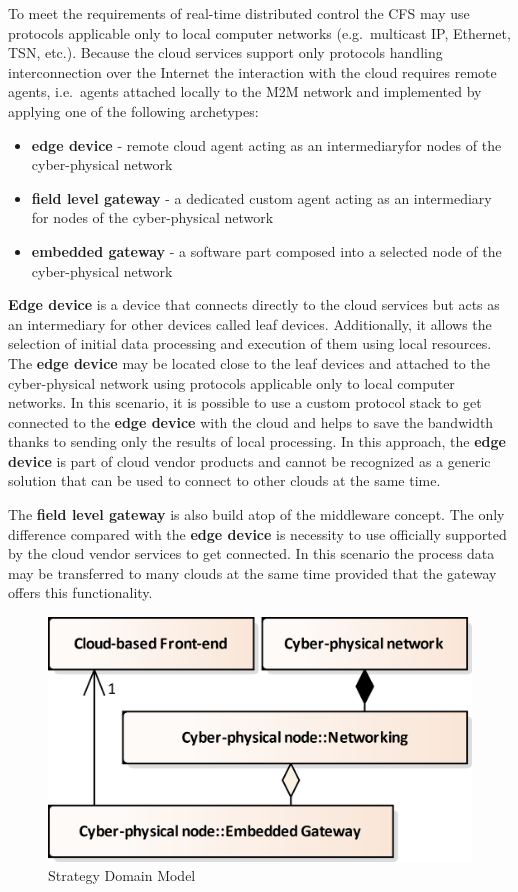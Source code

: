 \documentclass{jacsart}
\begin{document}
To meet the requirements of real-time distributed control the CFS may use protocols applicable only to local computer networks (e.g.~multicast IP, Ethernet, TSN, etc.). Because the cloud services support only protocols handling interconnection over the Internet the interaction with the cloud requires remote agents, i.e.~agents attached locally to the M2M network and implemented by applying one of the following archetypes:

\begin{itemize}
      \item \textbf{edge device} - remote cloud agent acting as an intermediaryfor nodes of the cyber-physical network
      \item \textbf{field level gateway} - a dedicated custom agent acting as an intermediary for nodes of the cyber-physical network
      \item \textbf{embedded gateway} - a software part composed into a selected node of the cyber-physical network
\end{itemize}

\textbf{Edge device} is a device that connects directly to the cloud services but acts as an intermediary for other devices called leaf devices. Additionally, it allows the selection of initial data processing and execution of them using local resources. The \textbf{edge device} may be located close to the leaf devices and attached to the cyber-physical network using protocols applicable only to local computer networks. In this scenario, it is possible to use a custom protocol stack to get connected to the \textbf{edge device} with the cloud and helps to save the bandwidth thanks to sending only the results of local processing. In this approach, the \textbf{edge device} is part of cloud vendor products and cannot be recognized as a generic solution that can be used to connect to other clouds at the same time.

The \textbf{field level gateway} is also build atop of the middleware concept. The only difference compared with the \textbf{edge device} is necessity to use officially supported by the cloud vendor services to get connected. In this scenario the process data may be transferred to many clouds at the same time provided that the gateway offers this functionality.

\begin{figure}
      \centering
      \includegraphics{../.Media/StrategyDomainModel.png}
      \caption{Strategy Domain Model}\label{StrategyDomainModel}
\end{figure}
\end{document}
